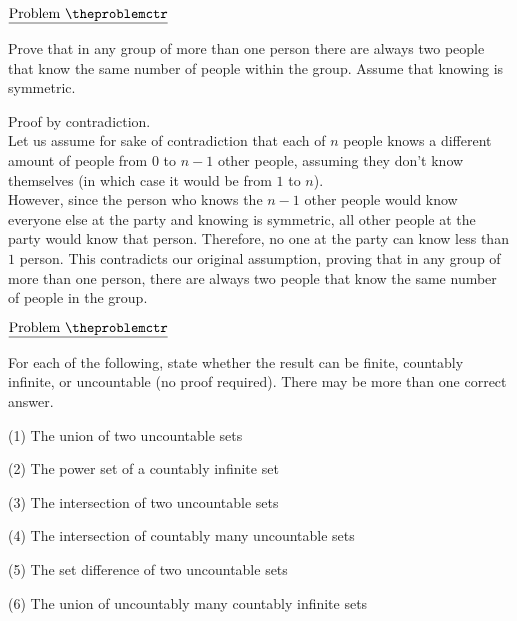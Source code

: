\documentclass[11pt]{article}
\newenvironment{mathline}{\begin{adjustwidth}{1cm}{}}{\end{adjustwidth}}
\def\pp{\par\noindent}
\begin{document}
\addtocounter{problemctr}{1}
\bigskip
\noindent
$\underline{\rm Problem\ \theproblemctr}$\pp Prove that in any group of more
than one person there are always two people that know the same number of people
within the group. Assume that knowing is symmetric.\\

\begin{mathline}
Proof by contradiction.\\
Let us assume for sake of contradiction that each of $n$ people knows a different amount of people from $0$ to $n-1$ other people, assuming they don't know themselves (in which case it would be from $1$ to $n$).\\
However, since the person who knows the $n-1$ other people would know everyone else at the party and knowing is symmetric, all other people at the party would know that person. Therefore, no one at the party can know less than $1$ person. This contradicts our original assumption, proving that in any group of more than one person, there are always two people that know the same number of people in the group.\\
\end{mathline}

\addtocounter{problemctr}{1}
\bigskip
\noindent
$\underline{\rm Problem\ \theproblemctr}$\pp For each of the following, state
whether the result can be finite, countably infinite, or uncountable (no proof
required). There may be more than one correct answer.

\noindent
(1) The union of two uncountable sets

\noindent
(2) The power set of a countably infinite set

\noindent
(3) The intersection of two uncountable sets

\noindent
(4) The intersection of countably many uncountable sets

\noindent
(5) The set difference of two uncountable sets

\noindent
(6) The union of uncountably many countably infinite sets\\
\end{document}
